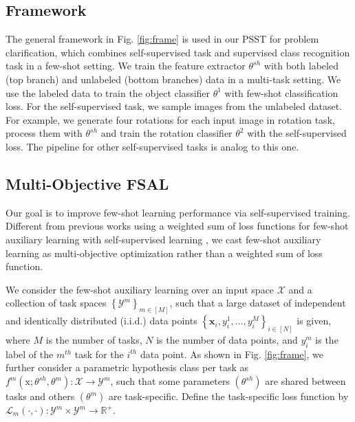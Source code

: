 \documentclass[final]{cvpr}
\begin{document}
\subsection{Framework} 
The general framework in Fig. \ref{fig:frame} is used in our PSST for problem clarification, which combines self-supervised task and supervised class recognition task in a few-shot setting. We train the feature extractor $\theta^{sh}$ with both labeled (top branch) and unlabeled (bottom branches) data in a multi-task setting. We use the labeled data to train the object classifier $\theta^1$ with few-shot classification loss. For the self-supervised task, we sample images from the unlabeled dataset. For example, we generate four rotations for each input image in rotation task, process them with $\theta^{sh}$ and train the rotation classifier $\theta^2$ with the self-supervised loss. The pipeline for other self-supervised tasks is analog to this one.  


\subsection{ Multi-Objective FSAL}

Our goal is to improve few-shot learning performance via self-supervised training.
Different from previous works using a weighted sum of loss functions for few-shot auxiliary learning with self-supervised learning \cite{DvornikMS19,GidarisBKPC19}, 
we cast few-shot auxiliary learning as multi-objective optimization rather than a weighted sum of loss function.


We consider the few-shot auxiliary learning over an input space $\mathcal{X}$ and a collection of task spaces
$\left\{\mathcal{Y}^{m}\right\}_{m \in[M]}$, such that a large dataset of independent and identically distributed (i.i.d.) data points $\left\{\mathbf{x}_{i}, y_{i}^{1}, \ldots, y_{i}^{M}\right\}_{i \in[N]}$ is given,
 where $M$ is the number of tasks, $N$ is the number of data points, and $y_{i}^{m}$ is the label of the $m^{th}$ task for the $i^{th}$ data point.
As shown in Fig. \ref{fig:frame}, we further consider a parametric hypothesis class per task as $f^{m}\left(\mathrm{x} ; {\theta}^{s h}, {\theta}^{m}\right): \mathcal{X} \rightarrow \mathcal{Y}^{m}$, such that some parameters $\left(\theta^{s h}\right)$ are shared between tasks and others $\left(\theta^{m}\right)$ are task-specific. Define the task-specific loss function by $\mathcal{L}_{m}(\cdot, \cdot): \mathcal{Y}^{m} \times \mathcal{Y}^{m} \rightarrow \mathbb{R}^{+}$. 
\end{document}
